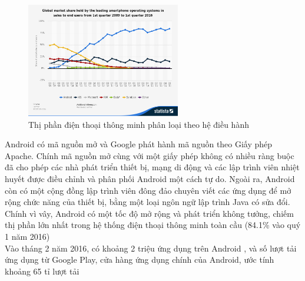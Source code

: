 \documentclass[a4paper]{article}
\begin{document}
\begin{figure}
    \centering
    \includegraphics[width=0.6\textwidth]{android_shipment_market.png}
    \caption{Thị phần điện thoại thông minh phân loại theo hệ điều hành}
\end{figure}
Android có mã nguồn mở và Google phát hành mã nguồn theo Giấy phép Apache. Chính mã nguồn mở cùng với một giấy phép không có nhiều ràng buộc đã cho phép các nhà phát triển thiết bị, mạng di động và các lập trình viên nhiệt huyết được điều chỉnh và phân phối Android một cách tự do. Ngoài ra, Android còn có một cộng đồng lập trình viên đông đảo chuyên viết các ứng dụng để mở rộng chức năng của thiết bị, bằng một loại ngôn ngữ lập trình Java có sửa đổi. Chính vì vây, Android có một tốc độ mở rộng và phát triển không tưởng, chiếm thị phần lớn nhất trong hệ thống điện thoại thông minh toàn cầu (84.1\% vào quý 1 năm 2016) \cite{bib6} \\
\newpage
 Vào tháng 2 năm 2016, có khoảng 2 triệu ứng dụng trên Android \cite{bib7}, và số lượt tải ứng dụng từ Google Play, cửa hàng ứng dụng chính của Android, ước tính khoảng 65 tỉ lượt tải \cite{bib8}
 
\end{document}
